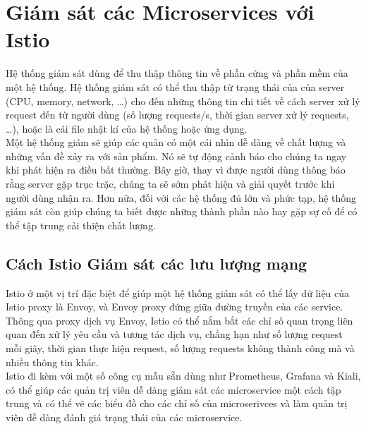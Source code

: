 \documentclass[12pt,a4paper]{report}
\begin{document}
\section{Giám sát các Microservices với Istio}
	{\hspace{0.6cm}Hệ thống giám sát dùng để thu thập thông tin về phần cứng và phần mềm của một hệ thống. Hệ thống giám sát có thể thu thập từ trạng thái của của server (CPU, memory, network, …) cho đến những thông tin chi tiết về cách server xử lý request đến từ người dùng (số lượng requests/s, thời gian server xử lý requests, …), hoặc là cái file nhật kí của hệ thống hoặc ứng dụng.\\
	
	Một hệ thống giám sẽ giúp các quản có một cái nhìn dễ dàng về chất lượng và những vấn đề xảy ra với sản phẩm. Nó sẽ tự động cảnh báo cho chúng ta ngay khi phát hiện ra điều bất thường. Bây giờ, thay vì được người dùng thông báo rằng server gặp trục trặc, chúng ta sẽ sớm phát hiện và giải quyết trước khi người dùng nhận ra. Hơn nữa, đối với các hệ thống đủ lớn và phức tạp, hệ thống giám sát còn giúp chúng ta biết được những thành phần nào hay gặp sự cố để có thể tập trung cải thiện chất lượng.
		\subsection{Cách Istio Giám sát các lưu lượng mạng}
	{\hspace{0.6cm}Istio ở một vị trí đặc biệt để giúp một hệ thống giám sát có thể lấy dữ liệu của Istio proxy là Envoy, và Envoy proxy đứng giữa đường truyền của các service. Thông qua proxy dịch vụ Envoy, Istio có thể nắm bắt các chỉ số quan trọng liên quan đến xử lý yêu cầu và tương tác dịch vụ, chẳng hạn như số lượng request mỗi giây, thời gian thực hiện request, số lượng requests không thành công mà và nhiều thông tin khác.\\		
	
	Istio đi kèm với một số công cụ mẫu sẵn dùng như Prometheus, Grafana và Kiali, có thể giúp các quản trị viên dễ dàng giám sát các microservice một cách tập trung và có thể vẽ các biểu đồ cho các chỉ số của microserivces và làm quản trị viên dễ dàng đánh giá trạng thái của các microservice.
	
}}
\end{document}
